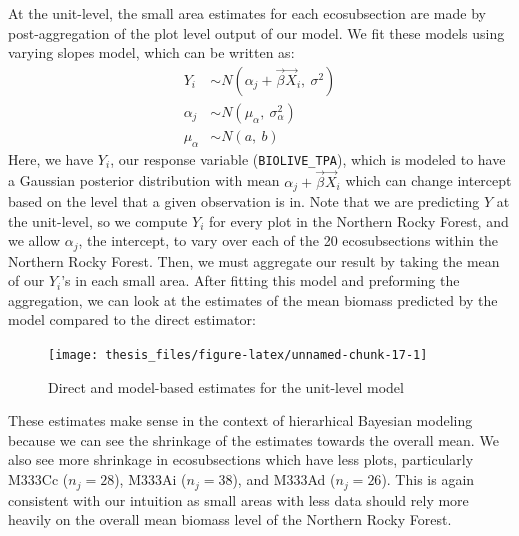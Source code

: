 \documentclass[12pt,twoside]{reedthesis}
\begin{document}
At the unit-level, the small area estimates for each ecosubsection are made by post-aggregation of the plot level output of our model. We fit these models using varying slopes model, which can be written as:
\begin{align*}
Y_i &\sim N(\alpha_j + \vec\beta\vec X_i,~ \sigma^2) \\
\alpha_j &\sim N(\mu_\alpha,~ \sigma^2_\alpha) \\
\mu_\alpha &\sim N(a,~b)
\end{align*}
Here, we have \(Y_i\), our response variable (\texttt{BIOLIVE\_TPA}), which is modeled to have a Gaussian posterior distribution with mean \(\alpha_j + \vec\beta\vec X_i\) which can change intercept based on the level that a given observation is in. Note that we are predicting \(Y\) at the unit-level, so we compute \(Y_i\) for every plot in the Northern Rocky Forest, and we allow \(\alpha_j\), the intercept, to vary over each of the 20 ecosubsections within the Northern Rocky Forest. Then, we must aggregate our result by taking the mean of our \(Y_i\)'s in each small area. After fitting this model and preforming the aggregation, we can look at the estimates of the mean biomass predicted by the model compared to the direct estimator:
\begin{figure}

{\centering \texttt{[image: thesis\_files/figure-latex/unnamed-chunk-17-1]} 

}

\caption{Direct and model-based estimates for the unit-level model}\label{fig:unnamed-chunk-17}
\end{figure}
These estimates make sense in the context of hierarhical Bayesian modeling because we can see the shrinkage of the estimates towards the overall mean. We also see more shrinkage in ecosubsections which have less plots, particularly M333Cc (\(n_j = 28\)), M333Ai (\(n_j = 38\)), and M333Ad (\(n_j = 26\)). This is again consistent with our intuition as small areas with less data should rely more heavily on the overall mean biomass level of the Northern Rocky Forest.
\end{document}
